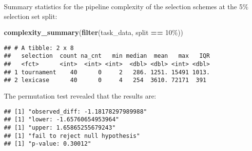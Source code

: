 \documentclass[
]{book}
\newenvironment{Shaded}{\begin{snugshade}}{\end{snugshade}}
\newcommand{\AttributeTok}[1]{\textcolor[rgb]{0.13,0.29,0.53}{#1}}
\newcommand{\DecValTok}[1]{\textcolor[rgb]{0.00,0.00,0.81}{#1}}
\newcommand{\FunctionTok}[1]{\textcolor[rgb]{0.13,0.29,0.53}{\textbf{#1}}}
\newcommand{\NormalTok}[1]{#1}
\newcommand{\OtherTok}[1]{\textcolor[rgb]{0.56,0.35,0.01}{#1}}
\newcommand{\SpecialCharTok}[1]{\textcolor[rgb]{0.81,0.36,0.00}{\textbf{#1}}}
\newcommand{\StringTok}[1]{\textcolor[rgb]{0.31,0.60,0.02}{#1}}
\begin{document}
Summary statistics for the pipeline complexity of the selection schemes at the 5\% selection set split:

\begin{Shaded}
\begin{Highlighting}[]
\FunctionTok{complexity\_summary}\NormalTok{(}\FunctionTok{filter}\NormalTok{(task\_data, split }\SpecialCharTok{==} \StringTok{\textquotesingle{}10\%\textquotesingle{}}\NormalTok{))}
\end{Highlighting}
\end{Shaded}

\begin{verbatim}
## # A tibble: 2 x 8
##   selection  count na_cnt   min median  mean   max   IQR
##   <fct>      <int>  <int> <int>  <dbl> <dbl> <int> <dbl>
## 1 tournament    40      0     2   286. 1251. 15491 1013.
## 2 lexicase      40      0     4   254  3610. 72171  391
\end{verbatim}

The permutation test revealed that the results are:

\begin{Shaded}
\end{Shaded}

\begin{verbatim}
## [1] "observed_diff: -1.18178297989988"
## [1] "lower: -1.65760654953964"
## [1] "upper: 1.65865255679243"
## [1] "fail to reject null hypothesis"
## [1] "p-value: 0.30012"
\end{verbatim}
\end{document}
